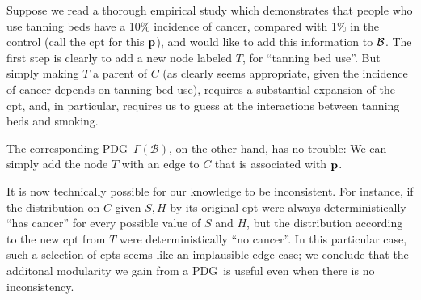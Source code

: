 \documentclass{article}
\newcommand{\MN}{PDG}
\numberwithin{equation}{section}
\begin{document}
	\begin{example}[continues=ex:smoking]
		Suppose we read a thorough empirical study which demonstrates that people who use tanning beds have a 10\% incidence of cancer, compared with 1\% in the control (call the cpt for this $\mathbf p$), and would like to add this information to $\cal B$. 
		The first step is clearly to add a new node labeled $T$, for ``tanning bed use''.  But simply making $T$ a parent of $C$ (as clearly seems appropriate, given the incidence of cancer depends on tanning bed use), requires a substantial expansion of the cpt, and, in particular, requires us to guess at the interactions between tanning beds and smoking. 
		
		
		The corresponding \MN\, $\Gamma(\mathcal B)$, on the other hand, has no trouble:
		We can simply add the node $T$ with an edge to $C$ that is associated with $\mathbf p$. 
		
		It is now technically possible for our knowledge to be inconsistent. For instance, if the distribution on $C$ given $S,H$ by its original cpt were always deterministically ``has cancer'' for every possible value of $S$ and $H$, but the distribution according to the new cpt from $T$ were deterministically ``no cancer''. 
		In this particular case, such a selection of cpts seems like an implausible edge case; we conclude that the additonal modularity we gain from a \MN\ is useful even when there is no inconsistency.

%			
	       
	\end{example}	
\end{document}

